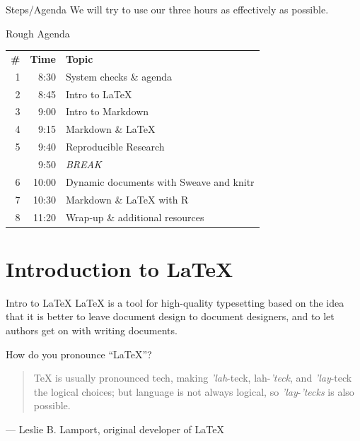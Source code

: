 \documentclass{beamer}
\begin{document}
\begin{frame}{Steps/Agenda}
We will try to use our three hours as effectively as possible.

\begin{exampleblock}{Rough Agenda}
\begin{center}
\begin{tabular}{r|r|l}
    \textbf{\#} & \textbf{Time} & \textbf{Topic} \\
    1 & 8:30 & System checks \& agenda \\
    2 & 8:45 & Intro to LaTeX \\
    3 & 9:00 & Intro to Markdown \\
    4 & 9:15 & Markdown \& LaTeX \\
    5 & 9:40 & Reproducible Research \\
    \hline
     & 9:50 & \emph{BREAK} \\
    \hline
    6 & 10:00 & Dynamic documents with Sweave and knitr \\
    7 & 10:30 & Markdown \& LaTeX with R \\
    8 & 11:20 & Wrap-up \& additional resources
\end{tabular}
\end{center}
\end{exampleblock}
\end{frame}

\section{Introduction to LaTeX}
\begin{frame}{Intro to LaTeX}
LaTeX is a tool for high-quality typesetting based on the idea that it is better to leave document design to document designers, and to let authors get on with writing documents.
\vfill
\begin{block}{How do you pronounce ``LaTeX''?}
    \begin{quote}
        TeX is usually pronounced tech, making \emph{'lah}-teck, lah-\emph{'teck}, and \emph{'lay}-teck the logical choices; but language is not always logical, so \emph{'lay}-\emph{'tecks} is also possible.
    \end{quote}
    --- Leslie B. Lamport, original developer of \LaTeX{}
\end{block}
\end{frame}
\end{document}
